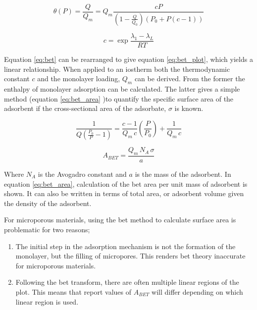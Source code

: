 \begin{equation}\label{eq:bet}
    \theta(P) = \frac{Q}{Q_m} =  Q_m \frac{c P}{\left( 1 - \frac{Q}{Q_0} \right) \left(P_0 + P \left(c - 1 \right) \right)}
\end{equation}

\begin{equation}\label{eq:bet_c}
    c = \exp{\frac{\lambda_1 - \lambda_L}{RT}}
\end{equation}

Equation \ref{eq:bet} can be rearranged to give equation \ref{eq:bet_plot}, which yields a linear relationship. When applied to an iostherm both the thermodynamic constant $c$ and the monolayer loading, $Q_m$ can be derived. From the former the enthalpy of monolayer adsorption can be calculated. The latter gives a simple method (equation \ref{eq:bet_area} )to quantify the specific surface area of the \gls{adsorbent} if the cross-sectional area of the \gls{adsorbate}, $\sigma$ is known.

\begin{equation} \label{eq:bet_plot}
    \frac{1}{Q  \left( \frac{P_0}{P} - 1 \right)} = \frac{c-1}{Q_m \, c}  \left( \frac{P}{P_0} \right) + \frac{1}{Q_m \, c}
\end{equation}

\begin{equation}\label{eq:bet_area}
    A_{BET} = \frac{Q_m \, N_A \, \sigma}{a}
\end{equation}

Where $N_A$ is the Avogadro constant and $a$ is the mass of the \gls{adsorbent}.\citep{Brunauer1938Adsorption} In equation \ref{eq:bet_area}, calculation of the \acrshort{bet} area per unit mass of \gls{adsorbent} is shown. It can also be written in terms of total area, or \gls{adsorbent} volume given the density of the \gls{adsorbent}.

For microporous materials, using the \acrshort{bet} method to calculate surface area is problematic for two reasons;

	\begin{enumerate}[label=(\arabic*)]
		\item The initial step in the \gls{adsorption} mechanism is not the formation of the monolayer, but the filling of \glspl{micropore}. This renders \acrshort{bet} theory inaccurate for microporous materials.
		\item 	Following the \acrshort{bet} transform, there are often multiple linear regions of the plot. This means that report values of $A_{BET}$ will differ depending on which linear region is used.
	\end{enumerate}

